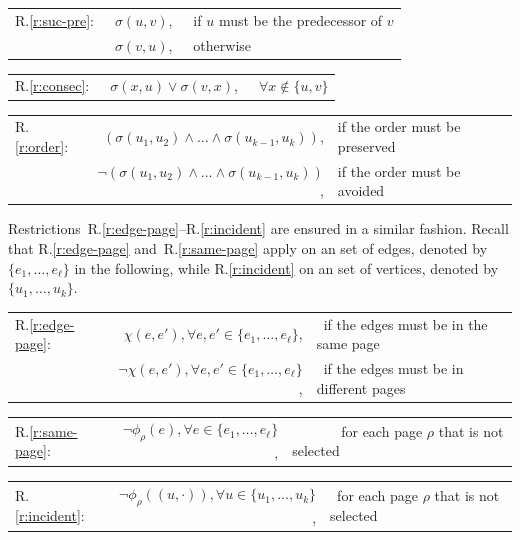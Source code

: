 \documentclass[runningheads]{llncs}
\newcommand{\tabularbefore}{\vspace{4pt}\noindent}
\newcommand{\tabularafter}{\vspace{4pt}}
\begin{document}
\tabularbefore
\begin{tabular}{@{}lrl}
R.\ref*{r:suc-pre}:~ & $\sigma(u,v)$, & ~if $u$ must be the predecessor of $v$ \\
& $\sigma(v,u)$, & ~otherwise \\
\end{tabular}
\tabularafter

\noindent
\begin{tabular}{@{}lrl}
R.\ref*{r:consec}:~ & $\sigma(x,u) \lor \sigma(v,x)$, & ~$\forall x \notin\{u,v\}$ \\
\end{tabular}
\tabularafter 

\noindent
\begin{tabular}{@{}lrl}
R.\ref*{r:order}: & $(\sigma(u_1,u_2)\wedge\ldots\wedge\sigma(u_{k-1},u_k))$, & if the order must be preserved\\ 
& $\neg(\sigma(u_1,u_2)\wedge\ldots\wedge\sigma(u_{k-1},u_k))$, & if the order must be avoided\\
\end{tabular}
\tabularafter

\noindent Restrictions~R.\ref{r:edge-page}--R.\ref{r:incident} are ensured in a similar fashion. Recall that R.\ref{r:edge-page} and~R.\ref{r:same-page} apply on an set of edges, denoted by $\{e_1,\ldots,e_\ell\}$ in the following, while R.\ref{r:incident} on an set of vertices, denoted by $\{u_1,\ldots,u_k\}$.

\tabularbefore
\begin{tabular}{@{}lrl}
R.\ref*{r:edge-page}:~ & $\chi(e,e'),\forall e,e'\in\{e_1,\ldots,e_\ell\}$, & ~if the edges must be in the same page\\
& $\neg\chi(e,e'),\forall e,e'\in\{e_1,\ldots,e_\ell\}$, & ~if the edges must be in different pages \\
\end{tabular}
\tabularafter

\noindent
\begin{tabular}{@{}lrl}
R.\ref*{r:same-page}:~ & $\neg\phi_{\rho}(e),\forall e \in \{e_1,\ldots,e_\ell\}$, & ~~~~~~~for each page $\rho$ that is not selected\\
\end{tabular}
\tabularafter

\noindent
\begin{tabular}{@{}lrl}
R.\ref*{r:incident}:~ & $\neg\phi_{\rho}((u,\cdot)),\forall u \in \{u_1,\ldots,u_k\}$, & ~for each page $\rho$ that is not selected\\
\end{tabular}
\tabularafter
\end{document}
